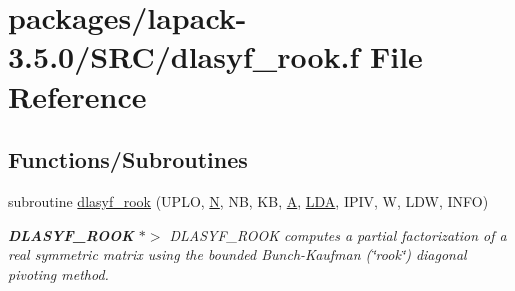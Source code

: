 \hypertarget{dlasyf__rook_8f}{}\section{packages/lapack-\/3.5.0/\+S\+R\+C/dlasyf\+\_\+rook.f File Reference}
\label{dlasyf__rook_8f}
\subsection*{Functions/\+Subroutines}
\begin{DoxyCompactItemize}
\item 
subroutine \hyperlink{group__doubleSYcomputational_ga5c894526bb8bb1133706d7697c7a6c81}{dlasyf\+\_\+rook} (U\+P\+L\+O, \hyperlink{polmisc_8c_a0240ac851181b84ac374872dc5434ee4}{N}, N\+B, K\+B, \hyperlink{classA}{A}, \hyperlink{example__user_8c_ae946da542ce0db94dced19b2ecefd1aa}{L\+D\+A}, I\+P\+I\+V, W, L\+D\+W, I\+N\+F\+O)
\begin{DoxyCompactList}\small\item\em {\bfseries D\+L\+A\+S\+Y\+F\+\_\+\+R\+O\+O\+K} $\ast$$>$ D\+L\+A\+S\+Y\+F\+\_\+\+R\+O\+O\+K computes a partial factorization of a real symmetric matrix using the bounded Bunch-\/\+Kaufman (\char`\"{}rook\char`\"{}) diagonal pivoting method. \end{DoxyCompactList}\end{DoxyCompactItemize}
